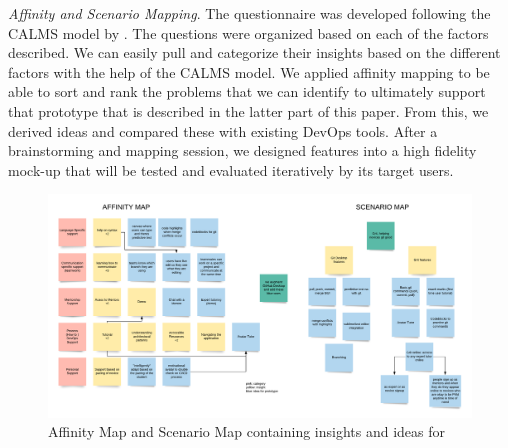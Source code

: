 \documentclass{sigchi}
\begin{document}
\textit{Affinity and Scenario Mapping}. The questionnaire was developed following the CALMS model by \cite{riley2014keep}. The questions were organized based on each of the factors described. We can easily pull and categorize their insights based on the different factors with the help of the CALMS model. We applied affinity mapping to be able to sort and rank the problems that we can identify to ultimately support that prototype that is described in the latter part of this paper. From this, we derived ideas and compared these with existing DevOps tools. After a brainstorming and mapping session, we designed features into a high fidelity mock-up that will be tested and evaluated iteratively by its target users. 
\begin{figure}[tp]
    \centering
    \includegraphics[width=1.75\columnwidth]{"figures/DevOpsX Qualitative Affinity for Prototype Design"}
    \caption{Affinity Map and Scenario Map containing insights and ideas for }
    \label{fig:Affinity}
\end{figure}
\end{document}
